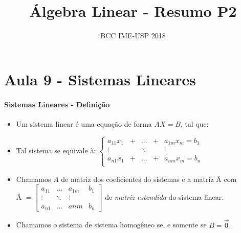 \documentclass[12pt]{article}
\author{BCC IME-USP 2018}
\title{Álgebra Linear - Resumo P2}
\begin{document}
\maketitle
\section{Aula 9 - Sistemas Lineares}
\paragraph{Sistemas Lineares - Definição}

	\begin{itemize}
	\item Um sistema linear é uma equação de forma $AX = B$, tal que:\\
	
	\item Tal sistema se equivale à:
	$ \left\lbrace
	\begin{matrix} 
	a_{11}x_1 & + & \dots & + & a_{1m}x_m = b_1\\
	\vdots & & \ddots & & \vdots \\
	 a_{n1}x_1 & + & \dots & + & a_{nm}x_m = b_n\\
	\end{matrix}\right.
	$
	
	\item Chamamos $A$ de matriz dos coeficientes do sistemas e a matriz Â com \\[5pt]
	Â $= \begin{bmatrix}
	a_{11} & \dots & a_{1m} & b_1 \\
	\vdots & \ddots & \vdots \\
	a_{n1} & \dots & a{nm} & b_n
	\end{bmatrix}$
	de \textit{matriz estendida} do sistema linear.

	\item Chamamos o sistema de sistema homogêneo se, e somente se $B = \overrightarrow{0}$.
	\end{itemize}
	
\end{document}
